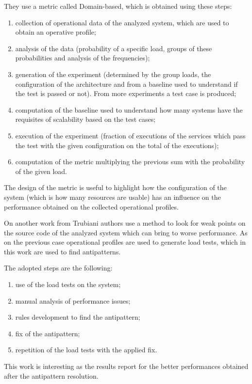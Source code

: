 They use a metric called Domain-based, which is obtained using these steps:
\begin{enumerate}
    \item collection of operational data of the analyzed system, which are used to obtain an operative profile;
    \item analysis of the data (probability of a specific load, groups of these probabilities and analysis of the frequencies);
    \item generation of the experiment (determined by the group loads, the configuration of the architecture and from a baseline used to understand if the test is passed or not). From more experiments a test case is produced;
    \item computation of the baseline used to understand how many systems have the requisites of scalability based on the test cases;
    \item execution of the experiment (fraction of executions of the services which pass the test with the given configuration on the total of the executions);
    \item computation of the metric multiplying the previous sum with the probability of the given load.
\end{enumerate}

The design of the metric is useful to highlight how the configuration of the system (which is how many resources are usable) has an influence on the performance obtained on the collected operational profiles.

On another work from Trubiani\cite{trubiani2018exploiting} authors use a method to look for weak points on the source code of the analyzed system which can bring to worse performance.
As on the previous case operational profiles are used to generate load tests, which in this work are used to find antipatterns.

The adopted steps are the following:
\begin{enumerate}
    \item use of the load tests on the system;
    \item manual analysis of performance issues;
    \item rules development to find the antipattern;
    \item fix of the antipattern;
    \item repetition of the load tests with the applied fix.
\end{enumerate}

This work is interesting as the results report for the better performances obtained after the antipattern resolution.

